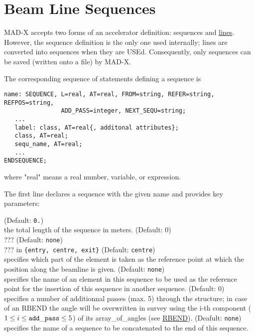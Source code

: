 
\chapter{Beam Line Sequences}
\label{chap:sequence}
MAD-X accepts two forms of an accelerator definition: sequences and
\href{line.html}{lines}. However, the sequence definition is the only
one used internally; lines are converted into sequences when they are
USEd. Consequently, only sequences can be saved (written onto a file)
by MAD-X.  

The corresponding sequence of statements defining a sequence is 
\begin{verbatim}
name: SEQUENCE, L=real, AT=real, FROM=string, REFER=string, REFPOS=string, 
                ADD_PASS=integer, NEXT_SEQU=string;
   ...
   label: class, AT=real{, additonal attributes}; 
   class, AT=real;
   sequ_name, AT=real;
   ...
ENDSEQUENCE;
\end{verbatim} 
where "real" means a real number, variable, or expression. 

The first line declares a sequence with the given name and provides key 
parameters:
\begin{madlist}
    (Default: {\tt 0.})\\
     the total length of the sequence in meters. 
    (Default: 0)\\
     ???
    (Default: {\tt none})\\
     ???
    in {\tt \{entry, centre, exit\}} (Default:
          {\tt centre}) \\
     specifies which part of the element is taken as the reference point 
     at which the position along the beamline is given.
    (Default: {\tt none})\\
   specifies the name of an element in this sequence to be used as the
   reference point for the insertion of this sequence in another
   sequence.  
    (Default: 0)\\ 
     specifies a number of additionnal passes (max. 5) through the
     structure; in case of an RBEND the angle will be overwritten in  survey
     using the i-th component ($1 \le i \le {\tt add\_pass} \le 5$) of
     its array\_of\_angles (see \href{bend.html}{RBEND}). 
    (Deafult: {\tt none})\\
     specifies the name of a sequence to be concatenated 
     to the end of this sequence. 
\end{madlist}
 
